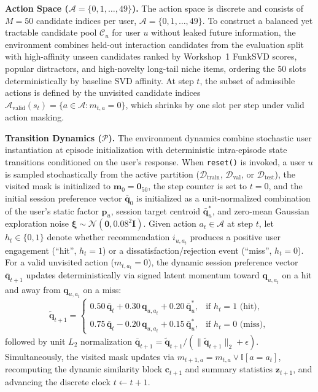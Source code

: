 \textbf{Action Space ($\mathcal{A} = \{0, 1, \dots, 49\}$).} The action space is discrete and consists of $M = 50$ candidate indices per user, $\mathcal{A} = \{0, 1, \dots, 49\}$. To construct a balanced yet tractable candidate pool $\mathcal{C}_u$ for user $u$ without leaked future information, the environment combines held-out interaction candidates from the evaluation split with high-affinity unseen candidates ranked by Workshop~1 FunkSVD scores, popular distractors, and high-novelty long-tail niche items, ordering the $50$ slots deterministically by baseline SVD affinity. At step $t$, the subset of admissible actions is defined by the unvisited candidate indices $\mathcal{A}_{\text{valid}}(s_t) = \{a \in \mathcal{A} : m_{t,a} = 0\}$, which shrinks by one slot per step under valid action masking.

\textbf{Transition Dynamics ($\mathcal{P}$).} The environment dynamics combine stochastic user instantiation at episode initialization with deterministic intra-episode state transitions conditioned on the user's response. When \texttt{reset()} is invoked, a user $u$ is sampled stochastically from the active partition ($\mathcal{D}_{\text{train}}$, $\mathcal{D}_{\text{val}}$, or $\mathcal{D}_{\text{test}}$), the visited mask is initialized to $\mathbf{m}_0 = \mathbf{0}_{50}$, the step counter is set to $t = 0$, and the initial session preference vector $\bar{\mathbf{q}}_0$ is initialized as a unit-normalized combination of the user's static factor $\mathbf{p}_u$, session target centroid $\bar{\mathbf{q}}_u^*$, and zero-mean Gaussian exploration noise $\boldsymbol{\xi} \sim \mathcal{N}(\mathbf{0}, 0.08^2 \mathbf{I})$. Given action $a_t \in \mathcal{A}$ at step $t$, let $h_t \in \{0, 1\}$ denote whether recommendation $i_{u,a_t}$ produces a positive user engagement (``hit'', $h_t = 1$) or a dissatisfaction/rejection event (``miss'', $h_t = 0$). For a valid unvisited action ($m_{t,a_t} = 0$), the dynamic session preference vector $\bar{\mathbf{q}}_{t+1}$ updates deterministically via signed latent momentum toward $\mathbf{q}_{u,a_t}$ on a hit and away from $\mathbf{q}_{u,a_t}$ on a miss:
\begin{equation}
\label{eq:session_belief_update}
\tilde{\mathbf{q}}_{t+1} = 
\begin{cases}
0.50\,\bar{\mathbf{q}}_t + 0.30\,\mathbf{q}_{u,a_t} + 0.20\,\bar{\mathbf{q}}_u^*, & \text{if } h_t = 1 \text{ (hit)}, \\[4pt]
0.75\,\bar{\mathbf{q}}_t - 0.20\,\mathbf{q}_{u,a_t} + 0.15\,\bar{\mathbf{q}}_u^*, & \text{if } h_t = 0 \text{ (miss)},
\end{cases}
\end{equation}
followed by unit $L_2$ normalization $\bar{\mathbf{q}}_{t+1} = \tilde{\mathbf{q}}_{t+1} / (\|\tilde{\mathbf{q}}_{t+1}\|_2 + \epsilon)$. Simultaneously, the visited mask updates via $m_{t+1,a} = m_{t,a} \lor \mathbb{I}[a = a_t]$, recomputing the dynamic similarity block $\mathbf{c}_{t+1}$ and summary statistics $\mathbf{z}_{t+1}$, and advancing the discrete clock $t \leftarrow t + 1$.

